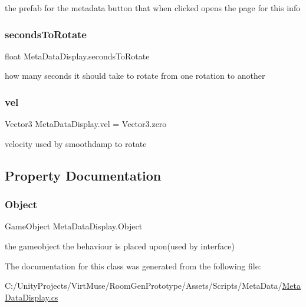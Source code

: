the prefab for the metadata button that when clicked opens the page for this info 

\mbox{\label{class_meta_data_display_a612841c627976605dcf6e6463ae9263a}} 
\subsubsection{\texorpdfstring{seconds\+To\+Rotate}{secondsToRotate}}
{\footnotesize\ttfamily float Meta\+Data\+Display.\+seconds\+To\+Rotate\hspace{0.3cm}{\ttfamily [private]}}



how many seconds it should take to rotate from one rotation to another 

\mbox{\label{class_meta_data_display_acf43e79c248b25fb43dcf3d997c25c59}} 
\subsubsection{\texorpdfstring{vel}{vel}}
{\footnotesize\ttfamily Vector3 Meta\+Data\+Display.\+vel = Vector3.\+zero\hspace{0.3cm}{\ttfamily [private]}}



velocity used by smoothdamp to rotate 



\subsection{Property Documentation}
\mbox{\label{class_meta_data_display_a6c8c48f48c075530099da10bb4b9b7c4}} 
\subsubsection{\texorpdfstring{Object}{Object}}
{\footnotesize\ttfamily Game\+Object Meta\+Data\+Display.\+Object\hspace{0.3cm}{\ttfamily [get]}}



the gameobject the behaviour is placed upon(used by interface) 



The documentation for this class was generated from the following file\+:\begin{DoxyCompactItemize}
\item 
C\+:/\+Unity\+Projects/\+Virt\+Muse/\+Room\+Gen\+Prototype/\+Assets/\+Scripts/\+Meta\+Data/\mbox{\hyperlink{_meta_data_display_8cs}{Meta\+Data\+Display.\+cs}}\end{DoxyCompactItemize}
